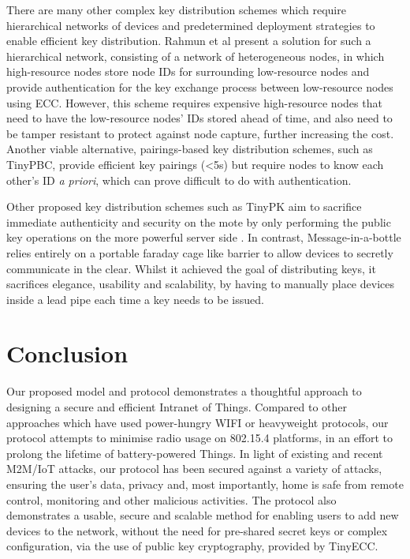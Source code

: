 \documentclass{mpaper}
\begin{document}
There are many other complex key distribution schemes which require hierarchical networks of devices \cite{MizanurRahman2010858,Shi2013235} and predetermined deployment strategies to enable efficient key distribution. Rahmun et al present a solution for such a hierarchical network\cite{MizanurRahman2010858}, consisting of a network of heterogeneous nodes, in which high-resource nodes store node IDs for surrounding low-resource nodes and provide authentication for the key exchange process between low-resource nodes using ECC. However, this scheme requires expensive high-resource nodes that need to have the low-resource nodes' IDs stored ahead of time, and also need to be tamper resistant to protect against node capture, further increasing the cost. Another viable alternative, pairings-based key distribution schemes, such as TinyPBC\cite{TinyPBC}, provide efficient key pairings (\textless5s) but require nodes to know each other's ID \textit{a priori}, which can prove difficult to do with authentication. 

Other proposed key distribution schemes such as TinyPK aim to sacrifice immediate authenticity and security on the mote by only performing the public key operations on the more powerful server side \cite{TinyPK}. In contrast, Message-in-a-bottle \cite{MessageBottle} relies entirely on a portable faraday cage like barrier to allow devices to secretly communicate in the clear. Whilst it achieved the goal of distributing keys, it sacrifices elegance, usability and scalability, by having to manually place devices inside a lead pipe each time a key needs to be issued.

\section{Conclusion}
\label{sec:conclusion}
Our proposed model and protocol demonstrates a thoughtful approach to designing a secure and efficient Intranet of Things. Compared to other approaches which have used power-hungry WIFI or heavyweight protocols, our protocol attempts to minimise radio usage on 802.15.4 platforms, in an effort to prolong the lifetime of battery-powered Things. In light of existing and recent M2M/IoT attacks, our protocol has been secured against a variety of attacks, ensuring the user's data, privacy and, most importantly, home is safe from remote control, monitoring and other malicious activities. The protocol also demonstrates a usable, secure and scalable method for enabling users to add new devices to the network, without the need for pre-shared secret keys or complex configuration, via the use of public key cryptography, provided by TinyECC. 
\end{document}
